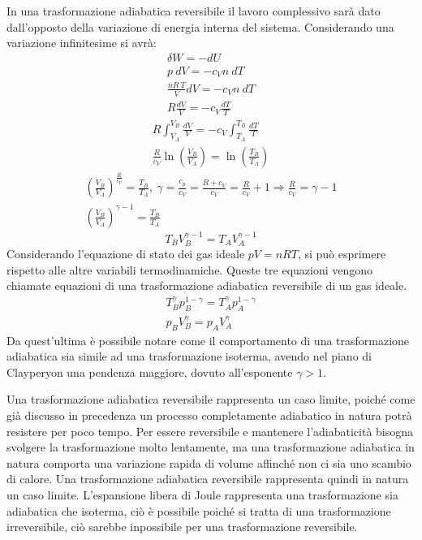\documentclass{article}
\numberwithin{equation}{subsection}
\begin{document}
In una trasformazione adiabatica reversibile il lavoro complessivo 
sarà dato dall'opposto della variazione di energia interna del sistema. 
Considerando una variazione infinitesime si avrà:
\begin{gather*}
    \delta W=-dU\\
    p\:dV=-c_Vn\:dT\\
    \displaystyle\frac{nR\:T}{V}dV=-c_Vn\:dT\\
    \displaystyle R\frac{dV}{V}=-c_V\frac{dT}{T}
\end{gather*}
\begin{gather*}
    \displaystyle R\int_{V_A}^{V_B}\frac{dV}{V}=-c_V\int_{T_A}^{T_B}\frac{dT}{T}\\
    \displaystyle\frac{R}{c_V}\ln\left(\frac{V_B}{V_A}\right)=\ln\left(\frac{T_B}{T_A}\right)
\end{gather*}
\begin{gather*}
    \displaystyle\left(\frac{V_B}{V_A}\right)^{\frac{R}{c_V}}=\frac{T_B}{T_A},\:\gamma=\frac{c_p}{c_V}=\frac{R+c_V}{c_V}=\frac{R}{c_V}+1\Rightarrow\frac{R}{c_V}=\gamma-1\\
    \displaystyle\left(\frac{V_B}{V_A}\right)^{\gamma-1}=\frac{T_B}{T_A}
\end{gather*}
\begin{equation}
    T_BV_B^{\gamma-1}=T_AV_A^{\gamma-1}
\end{equation}
Considerando l'equazione di stato dei gas ideale $pV=nRT$, si può esprimere rispetto alle altre variabili termodinamiche. Queste tre equazioni vengono chiamate equazioni 
di una trasformazione adiabatica reversibile di un gas ideale.  
\begin{gather}
    T_B^{\gamma}p_B^{1-\gamma}=T_A^{\gamma}p_A^{1-\gamma}\\
    p_BV_B^{\gamma}=p_AV_A^{\gamma}
\end{gather}
Da quest'ultima è possibile notare come il comportamento di una 
trasformazione adiabatica sia simile ad una trasformazione 
isoterma, avendo nel piano di Clayperyon una pendenza 
maggiore, dovuto all'esponente $\gamma>1$. 


Una trasformazione adiabatica reversibile rappresenta un caso limite, poiché come già discusso in precedenza un processo completamente adiabatico in natura potrà resistere 
per poco tempo. Per essere reversibile e mantenere l'adiabaticità bisogna svolgere la trasformazione molto lentamente, ma una trasformazione adiabatica in natura comporta una variazione rapida di 
volume affinché non ci sia uno scambio di calore. Una trasformazione adiabatica reversibile rappresenta quindi in natura un caso limite. L'espansione libera di Joule rappresenta 
una trasformazione sia adiabatica che isoterma, ciò è possibile poiché si tratta di una trasformazione irreversibile, ciò sarebbe inpossibile per una trasformazione reversibile. 
\end{document}
